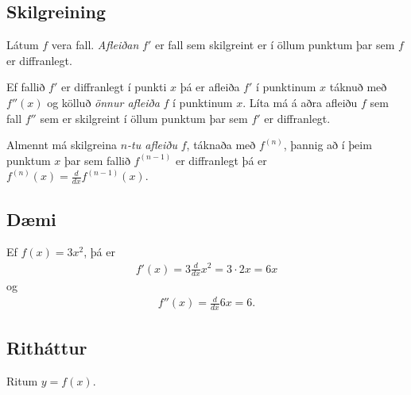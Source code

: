 \documentclass[a4paper,10pt,icelandic]{sphinxmanual}
\begin{document}
\subsection{Skilgreining}
\label{kafli03:skilgreining}
Látum \(f\) vera fall. \emph{Afleiðan} \(f'\) er fall sem skilgreint er
í öllum punktum þar sem \(f\) er diffranlegt.

Ef fallið \(f'\) er diffranlegt í punkti \(x\) þá er afleiða
\(f'\) í punktinum \(x\) táknuð með \(f''(x)\) og kölluð
\textit{önnur afleiða} \(f\) í punktinum \(x\). Líta má á aðra afleiðu
\(f\) sem fall \(f''\) sem er skilgreint í öllum punktum þar sem
\(f'\) er diffranlegt.

Almennt má skilgreina \(n\)\emph{-tu afleiðu} \(f\), táknaða með
\(f^{(n)}\), þannig að í þeim punktum \(x\) þar sem fallið
\(f^{(n-1)}\) er diffranlegt þá er
\(f^{(n)}(x)=\frac{d}{dx}f^{(n-1)}(x)\).


\subsection{Dæmi}
\label{kafli03:id8}
Ef \(f(x)  = 3x^2\), þá er
\begin{equation*}
\begin{split}f'(x) = 3\frac{d}{dx}x^2 = 3\cdot 2x = 6x\end{split}
\end{equation*}
og
\begin{equation*}
\begin{split}f''(x) = \frac{d}{dx} 6x = 6.\end{split}
\end{equation*}

\subsection{Ritháttur}
\label{kafli03:id9}
Ritum \(y=f(x)\).
\end{document}

